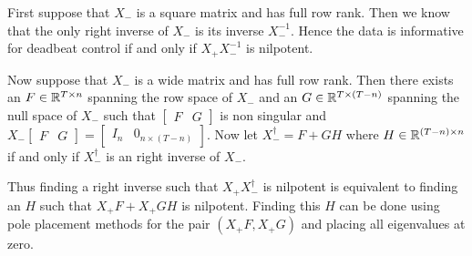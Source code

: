 First suppose that $X_-$ is a square matrix and has full row rank. Then we know that the only right inverse of $X_-$ is its inverse $X_-^{-1}$. Hence the data is informative for deadbeat control if and only if $X_+ X_-^{-1}$ is nilpotent. 

Now suppose that $X_-$ is a wide matrix and has full row rank. Then there exists an $F \in \mathbb{R}^{T \times n}$ spanning the row space of $X_-$ and an $G \in \mathbb{R}^{T \times (T-n)}$ spanning the null space of $X_-$ such that $\begin{bmatrix}F&G\end{bmatrix}$ is non singular and $X_- \begin{bmatrix}F&G\end{bmatrix} = \begin{bmatrix}I_n&0_{n\times (T-n)}\end{bmatrix}$. Now let $X^\dagger_- = F + G H$ where $H \in \mathbb{R}^{(T-n) \times n}$ if and only if $X_-^\dagger$ is an right inverse of $X_-$.



Thus finding a right inverse such that $X_+ X_-^\dagger$ is nilpotent is equivalent to finding an $H$ such that $X_+ F + X_+ G H$ is nilpotent. Finding this $H$ can be done using pole placement methods for the pair $(X_+ F, X_+ G)$ and placing all eigenvalues at zero.



